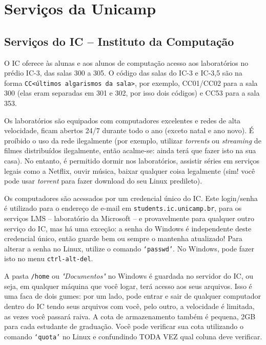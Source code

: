 
\section{Serviços da Unicamp}
\subsection{Serviços do IC -- Instituto da Computação}
\label{sec:ic_servicos}

O IC oferece às alunas e aos alunos de computação acesso aos laboratórios no
prédio IC-3, das salas 300 a 305. O código das salas do IC-3 e IC-3,5 são na
forma \texttt{CC<últimos algarismos da sala>}, por exemplo, CC01/CC02 para a
sala 300 (elas eram separadas em 301 e 302, por isso dois códigos) e CC53 para a
sala 353.

Os laboratórios são equipados com computadores excelentes e redes de alta
velocidade, ficam abertos 24/7 durante todo o ano (exceto natal e ano novo). É
proíbido o uso da rede ilegalmente (por exemplo, utilizar \emph{torrents} ou
\emph{streaming} de filmes distribuídos ilegalmente, então acalme-se: ainda
terá que fazer isto na sua casa). No entanto, é permitido dormir nos
laboratórios, assistir séries em serviços legais como a Netflix, ouvir música,
baixar qualquer coisa legalmente (sim! você pode usar \emph{torrent} para fazer
download do seu Linux predileto).

Os computadores são acessados por um credencial único do IC. Este login/senha é
utilizado para o endereço de e-mail em \texttt{students.ic.unicamp.br}, para os
serviços LMS -- laboratório da Microsoft -- e provavelmente para qualquer outro
serviço do IC, mas há uma exceção: a senha do Windows é independente deste
credencial único, então guarde bem ou sempre o mantenha atualizado! Para
alterar a senha no Linux, utilize o comando \texttt{`passwd'}. No Windows, pode
fazer isto no menu \texttt{ctrl-alt-del}.

A pasta \texttt{/home} ou \emph{"Documentos"} no Windows é guardada no servidor
do IC, ou seja, em qualquer máquina que você logar, terá acesso aos seus
arquivos. Isso é uma faca de dois gumes: por um lado, pode entrar e sair de
qualquer computador dentro do IC tendo seus arquivos com você, pelo outro, a
velocidade é limitada, as vezes você passará raiva. A cota de armazenamento
também é pequena, 2GB para cada estudante de graduação. Você pode verificar
sua cota utilizando o comando \texttt{`quota'} no Linux e confundindo TODA VEZ
qual coluna deve verificar.

